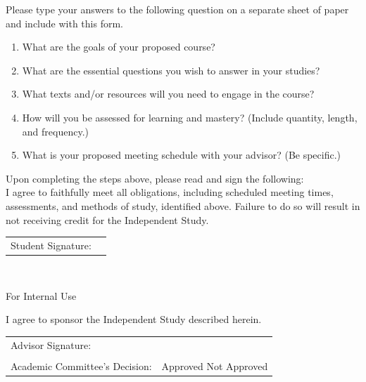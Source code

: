 Please type your answers to the following question on a separate sheet of paper and include with this form. 

\begin{enumerate}


  \item What are the goals of your proposed course?
  \item What are the essential questions you wish to answer in your studies?
  \item What texts and/or resources will you need to engage in the course?
  \item How will you be assessed for learning and mastery? (Include quantity, length, and frequency.) 
  \item What is your proposed meeting schedule with your advisor? (Be specific.) 
  \end{enumerate}

\noindent Upon completing the steps above, please read and sign the following: \\

I agree to faithfully meet all obligations, including scheduled meeting times, assessments, and methods of study, identified above. Failure to do so will result in not receiving credit for the Independent Study. \\

\renewcommand{\arraystretch}{1}
\noindent\begin{tabular}{ll}
Student Signature:  & \underline{\hspace{7cm}}\\

\end{tabular}\\


\vspace{.5cm}

\vfill

\noindent \hrulefill For Internal Use \hrulefill 

\vspace{.5cm}

\noindent I agree to sponsor the Independent Study described herein.\\

\renewcommand{\arraystretch}{1}
\noindent\begin{tabular}{ll}
Advisor Signature:  & \underline{\hspace{7cm}}\\
&\\
Academic Committee’s Decision:	& Approved  \hspace{.5cm} 	Not Approved
\end{tabular}\\





